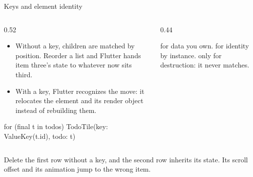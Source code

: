 \documentclass[10pt,aspectratio=169,t]{beamer}
\begin{document}
\begin{frame}[fragile,eyebrow=Rendering]{Keys and element identity}
  \begin{columns}[T]
    \begin{column}{0.52\textwidth}
      \begin{itemize}
        \item Without a key, children are matched by position. Reorder a list and Flutter hands item three's state to whatever now sits third.
        \item With a key, Flutter recognizes the move: it relocates the element and its render object instead of rebuilding them.
      \end{itemize}
\begin{dart}
for (final t in todos)
  TodoTile(key: ValueKey(t.id), todo: t)
\end{dart}
    \end{column}
    \begin{column}{0.44\textwidth}
      \begin{hint}
         for data you own.  for identity by instance.  only for destruction: it never matches.
      \end{hint}
    \end{column}
  \end{columns}
  \begin{takeaway}{Delete the first row without a key, and the second row inherits its state.}
    Its scroll offset and its animation jump to the wrong item.
  \end{takeaway}
\end{frame}
\end{document}
